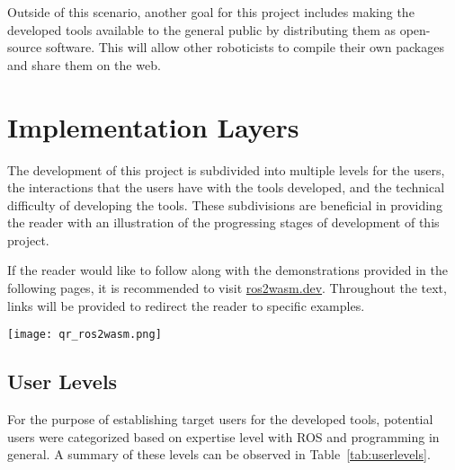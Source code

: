     Outside of this scenario, another goal for this project includes making the 
    developed tools available to the general public by distributing them as
    open-source software. This will allow other roboticists to compile their own
    packages and share them on the web.


\section{Implementation Layers}

    The development of this project is subdivided into multiple levels for the 
    users, the interactions that the users have with the tools developed, and
    the technical difficulty of developing the tools. These subdivisions are
    beneficial in providing the reader with an illustration of the progressing 
    stages of development of this project.


    \begin{tcolorbox}[title=Note]
        \begin{minipage}[t]{0.87\linewidth}
            \vspace*{0pt}
            If the reader would like to follow along with the demonstrations
            provided in the following pages, it is recommended to visit 
            \href{https://ros2wasm.dev/}{\textsf{ros2wasm.dev}}.
            Throughout the text, links will be provided to redirect the reader 
            to specific examples.
        \end{minipage}\hfill%
        \begin{minipage}[t]{0.1\linewidth}
            \vspace*{0pt}
            \texttt{[image: qr\_ros2wasm.png]}
        \end{minipage}
    \end{tcolorbox}


    \subsection{User Levels}

        For the purpose of establishing target users for the developed tools,
        potential users were categorized based on expertise level with \ac{ROS} 
        and programming in general. A summary of these levels can be  observed 
        in Table~\ref{tab:userlevels}.

